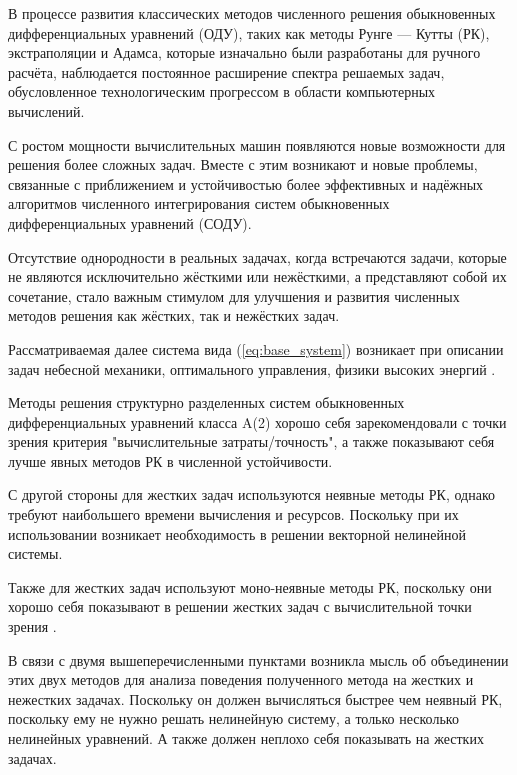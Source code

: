 \documentclass[a4paper,article,14pt]{extarticle}
\begin{document}


\tableofcontents
\pagebreak

В процессе развития классических методов численного решения обыкновенных дифференциальных уравнений (ОДУ), таких как методы Рунге — Кутты (РК), экстраполяции и Адамса, которые изначально были разработаны для ручного расчёта, наблюдается постоянное расширение спектра решаемых задач, обусловленное технологическим прогрессом в области компьютерных вычислений.

С ростом мощности вычислительных машин появляются новые возможности для решения более сложных задач. Вместе с этим возникают и новые проблемы, связанные с приближением и устойчивостью более эффективных и надёжных алгоритмов численного интегрирования систем обыкновенных дифференциальных уравнений (СОДУ).

Отсутствие однородности в реальных задачах, когда встречаются задачи, которые не являются исключительно жёсткими или нежёсткими, а представляют собой их сочетание, стало важным стимулом для улучшения и развития численных методов решения как жёстких, так и нежёстких задач.

Рассматриваемая далее система вида (\ref{eq:base_system}) возникает при описании задач небесной механики, оптимального управления, физики высоких энергий \cite{srk}.
\pagebreak

Методы решения структурно разделенных систем обыкновенных дифференциальных уравнений класса A(2) хорошо себя зарекомендовали с точки зрения критерия "вычислительные затраты/точность", а также показывают себя лучше явных методов РК в численной устойчивости.

С другой стороны для жестких задач используются неявные методы РК, однако требуют наибольшего времени вычисления и ресурсов. Поскольку при их использовании возникает необходимость в решении векторной нелинейной системы.

Также для жестких задач используют моно-неявные методы РК, поскольку они хорошо себя показывают в решении жестких задач с вычислительной точки зрения \cite{mirk}.

В связи с двумя вышеперечисленными пунктами возникла мысль об объединении этих двух методов для анализа поведения полученного метода на жестких и нежестких задачах. Поскольку он должен вычисляться быстрее чем неявный РК, поскольку ему не нужно решать нелинейную систему, а только несколько нелинейных уравнений. А также должен неплохо себя показывать на жестких задачах.
\end{document}
